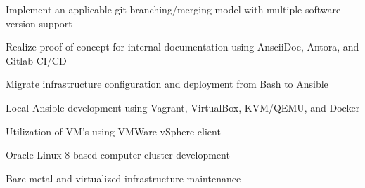 \begin{tightemize}
    \item Implement an applicable git branching/merging model with multiple software version support
    \item Realize proof of concept for internal documentation using AnsciiDoc, Antora, and Gitlab CI/CD
    \item Migrate infrastructure configuration and deployment from Bash to Ansible
    \item Local Ansible development using Vagrant, VirtualBox, KVM/QEMU, and Docker
    \item Utilization of VM's using VMWare vSphere client
    \item Oracle Linux 8 based computer cluster development
    \item Bare-metal and virtualized infrastructure maintenance
\end{tightemize}